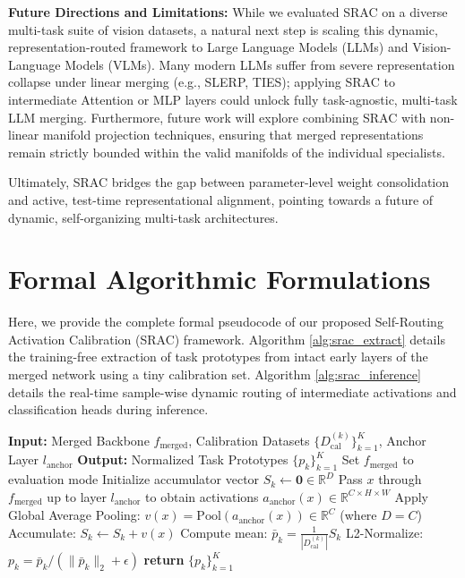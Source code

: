 \documentclass{article}
\theoremstyle{plain}
\theoremstyle{definition}
\theoremstyle{remark}
\begin{document}
\textbf{Future Directions and Limitations:} 
While we evaluated SRAC on a diverse multi-task suite of vision datasets, a natural next step is scaling this dynamic, representation-routed framework to Large Language Models (LLMs) and Vision-Language Models (VLMs). Many modern LLMs suffer from severe representation collapse under linear merging (e.g., SLERP, TIES); applying SRAC to intermediate Attention or MLP layers could unlock fully task-agnostic, multi-task LLM merging. Furthermore, future work will explore combining SRAC with non-linear manifold projection techniques, ensuring that merged representations remain strictly bounded within the valid manifolds of the individual specialists.

Ultimately, SRAC bridges the gap between parameter-level weight consolidation and active, test-time representational alignment, pointing towards a future of dynamic, self-organizing multi-task architectures.

\nocite{*}



\newpage
\appendix
\onecolumn

\section{Formal Algorithmic Formulations}
\label{sec:appendix_algorithms}

Here, we provide the complete formal pseudocode of our proposed Self-Routing Activation Calibration (SRAC) framework. Algorithm \ref{alg:srac_extract} details the training-free extraction of task prototypes from intact early layers of the merged network using a tiny calibration set. Algorithm \ref{alg:srac_inference} details the real-time sample-wise dynamic routing of intermediate activations and classification heads during inference.

\begin{algorithm}[h]
\caption{SRAC Task Prototype Extraction}
\label{alg:srac_extract}
\begin{algorithmic}[1]
\STATE \textbf{Input:} Merged Backbone $f_{\text{merged}}$, Calibration Datasets $\{D_{\text{cal}}^{(k)}\}_{k=1}^K$, Anchor Layer $l_{\text{anchor}}$
\STATE \textbf{Output:} Normalized Task Prototypes $\{p_k\}_{k=1}^K$
\STATE Set $f_{\text{merged}}$ to evaluation mode
    \STATE Initialize accumulator vector $S_k \leftarrow \mathbf{0} \in \mathbb{R}^D$
        \STATE Pass $x$ through $f_{\text{merged}}$ up to layer $l_{\text{anchor}}$ to obtain activations $a_{\text{anchor}}(x) \in \mathbb{R}^{C \times H \times W}$
        \STATE Apply Global Average Pooling: $v(x) = \text{Pool}(a_{\text{anchor}}(x)) \in \mathbb{R}^C$ (where $D=C$)
        \STATE Accumulate: $S_k \leftarrow S_k + v(x)$
    \ENDFOR
    \STATE Compute mean: $\bar{p}_k = \frac{1}{|D_{\text{cal}}^{(k)}|} S_k$
    \STATE L2-Normalize: $p_k = \bar{p}_k / (\|\bar{p}_k\|_2 + \epsilon)$
\ENDFOR
\STATE \textbf{return} $\{p_k\}_{k=1}^K$
\end{algorithmic}
\end{algorithm}
\end{document}
